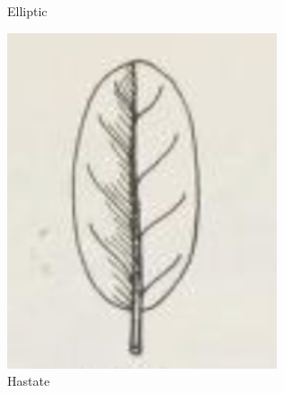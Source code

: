 \documentclass[12pt,english]{article}
\begin{document}
\begin{figure}[!hbt]
\begin{centre}
\begin{minipage}{0.19\textwidth}
	\end{minipage}
	\begin{minipage}{0.19\textwidth}
		\caption{Elliptic}
		\includegraphics[width=\textwidth]{../code/contour/original/elliptic}
	\end{minipage}
	\begin{minipage}{0.19\textwidth}
		\caption{Hastate}

\end{minipage}
\end{centre}
\end{figure}
\end{document}

